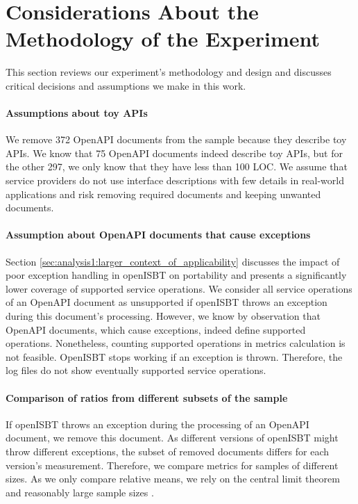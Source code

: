 

\section{Considerations About the Methodology of the Experiment}
\label{sec:discussion_limitations_methodology}

This section reviews our experiment's methodology and design and discusses critical decisions and assumptions we make in this work.

\paragraph{Assumptions about toy APIs}
We remove 372 OpenAPI documents from the sample because they describe toy APIs. We know that 75 OpenAPI documents indeed describe toy APIs, but for the other 297, we only know that they have less than 100 LOC. We assume that service providers do not use interface descriptions with few details in real-world applications and risk removing required documents and keeping unwanted documents. 

\paragraph{Assumption about OpenAPI documents that cause exceptions}
Section \ref{sec:analysis1:larger_context_of_applicability} discusses the impact of poor exception handling in openISBT on portability and presents a significantly lower coverage of supported service operations. We consider all service operations of an OpenAPI document as unsupported if openISBT throws an exception during this document's processing. However, we know by observation that OpenAPI documents, which cause exceptions, indeed define supported operations. Nonetheless, counting supported operations in metrics calculation is not feasible. OpenISBT stops working if an exception is thrown. Therefore, the log files do not show eventually supported service operations.  

\paragraph{Comparison of ratios from different subsets of the sample}
If openISBT throws an exception during the processing of an OpenAPI document, we remove this document. As different versions of openISBT might throw different exceptions, the subset of removed documents differs for each version's measurement. Therefore, we compare metrics for samples of different sizes. As we only compare relative means, we rely on the central limit theorem and reasonably large sample sizes \cite{central_limit_theorem}.